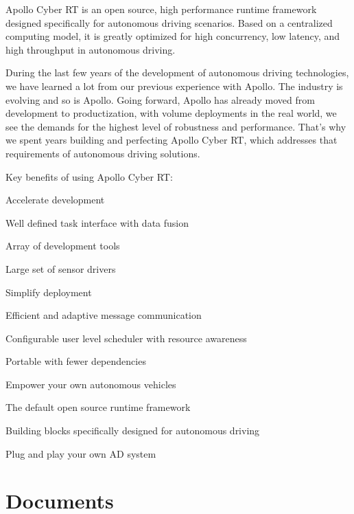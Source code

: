 Apollo Cyber R\-T is an open source, high performance runtime framework designed specifically for autonomous driving scenarios. Based on a centralized computing model, it is greatly optimized for high concurrency, low latency, and high throughput in autonomous driving.

During the last few years of the development of autonomous driving technologies, we have learned a lot from our previous experience with Apollo. The industry is evolving and so is Apollo. Going forward, Apollo has already moved from development to productization, with volume deployments in the real world, we see the demands for the highest level of robustness and performance. That’s why we spent years building and perfecting Apollo Cyber R\-T, which addresses that requirements of autonomous driving solutions.

Key benefits of using Apollo Cyber R\-T\-:


\begin{DoxyItemize}
\item Accelerate development
\begin{DoxyItemize}
\item Well defined task interface with data fusion
\item Array of development tools
\item Large set of sensor drivers
\end{DoxyItemize}
\item Simplify deployment
\begin{DoxyItemize}
\item Efficient and adaptive message communication
\item Configurable user level scheduler with resource awareness
\item Portable with fewer dependencies
\end{DoxyItemize}
\item Empower your own autonomous vehicles
\begin{DoxyItemize}
\item The default open source runtime framework
\item Building blocks specifically designed for autonomous driving
\item Plug and play your own A\-D system
\end{DoxyItemize}
\end{DoxyItemize}

\section*{Documents}


